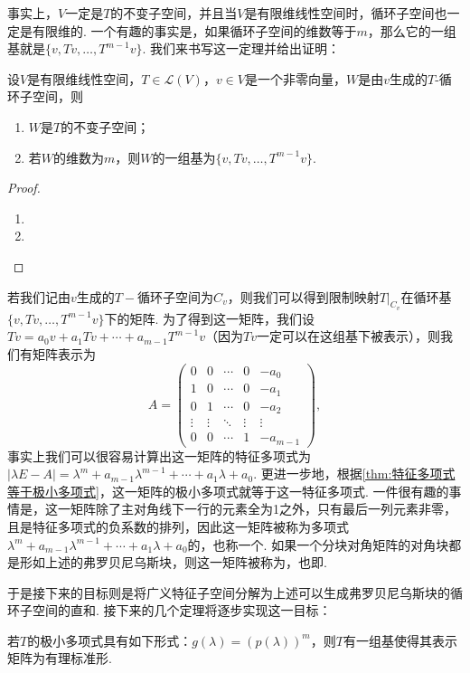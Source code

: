 事实上，$V$一定是$T$的不变子空间，并且当$V$是有限维线性空间时，循环子空间也一定是有限维的. 一个有趣的事实是，如果循环子空间的维数等于$m$，那么它的一组基就是$\{v,Tv,\ldots,T^{m-1}v\}$. 我们来书写这一定理并给出证明：
\begin{theorem}{}{}
    设$V$是有限维线性空间，$T\in\mathcal{L}(V)$，$v\in V$是一个非零向量，$W$是由$v$生成的$T$-循环子空间，则
    \begin{enumerate}
        \item $W$是$T$的不变子空间；
        \item 若$W$的维数为$m$，则$W$的一组基为$\{v,Tv,\ldots,T^{m-1}v\}$.
    \end{enumerate}
\end{theorem}
\begin{proof}
    \begin{enumerate}
        \item
        \item
    \end{enumerate}
\end{proof}

若我们记由$v$生成的$T-\text{循环子空间}$为$C_v$，则我们可以得到限制映射$T|_{C_v}$在循环基$\{v,Tv,\ldots,T^{m-1}v\}$下的矩阵. 为了得到这一矩阵，我们设$Tv=a_0v+a_1Tv+\cdots+a_{m-1}T^{m-1}v$（因为$Tv$一定可以在这组基下被表示），则我们有矩阵表示为
\[A=\begin{pmatrix}
        0      & 0      & \cdots & 0      & -a_0     \\
        1      & 0      & \cdots & 0      & -a_1     \\
        0      & 1      & \cdots & 0      & -a_2     \\
        \vdots & \vdots & \ddots & \vdots & \vdots   \\
        0      & 0      & \cdots & 1      & -a_{m-1}
    \end{pmatrix},\]
事实上我们可以很容易计算出这一矩阵的特征多项式为$|\lambda E-A|=\lambda^m+a_{m-1}\lambda^{m-1}+\cdots+a_1\lambda+a_0$. 更进一步地，根据\autoref{thm:特征多项式等于极小多项式}，这一矩阵的极小多项式就等于这一特征多项式. 一件很有趣的事情是，这一矩阵除了主对角线下一行的元素全为1之外，只有最后一列元素非零，且是特征多项式的负系数的排列，因此这一矩阵被称为多项式$\lambda^m+a_{m-1}\lambda^{m-1}+\cdots+a_1\lambda+a_0$的，也称一个. 如果一个分块对角矩阵的对角块都是形如上述的弗罗贝尼乌斯块，则这一矩阵被称为，也即.

于是接下来的目标则是将广义特征子空间分解为上述可以生成弗罗贝尼乌斯块的循环子空间的直和. 接下来的几个定理将逐步实现这一目标：
\begin{theorem}{}{}
    若$T$的极小多项式具有如下形式：$g(\lambda)=(p(\lambda))^m$，则$T$有一组基使得其表示矩阵为有理标准形.
\end{theorem}

